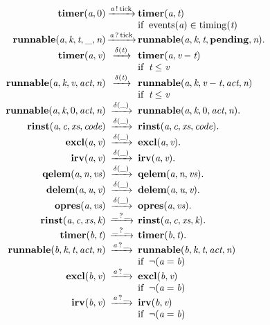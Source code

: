 \[\begin{array}{r@{}c@{}llllll}
\\\Prule{\Tstep{\Ttimer{\Tvar{A}}{0}}{\Tsay{\Tvar{A}}{\Ttick}}{\Ttimer{\Tvar{A}}{\Tvar{T}}}}{\Tmember{\Tevents{\Tvar{A}}}{\Ttiming{\Tvar{T}}}}
\\\Pfact{\Tstep{\Trunnable{\Tvar{A}}{\Tvar{K}}{\Tvar{T}}{\_}{\Tvar{N}}}{\Thear{\Tvar{A}}{\Ttick}}{\Trunnable{\Tvar{A}}{\Tvar{K}}{\Tvar{T}}{\Tpending}{\Tvar{N}}}}
\\\Prule{\Tstep{\Ttimer{\Tvar{A}}{\Tvar{V}}}{\Tdelta{\Tvar{T}}}{\Ttimer{\Tvar{A}}{\Tminus{\Tvar{V}}{\Tvar{T}}}}}{\Tlesseq{\Tvar{T}}{\Tvar{V}}}
\\\Prule{\Tstep{\Trunnable{\Tvar{A}}{\Tvar{K}}{\Tvar{V}}{\Tvar{Act}}{\Tvar{N}}}{\Tdelta{\Tvar{T}}}{\Trunnable{\Tvar{A}}{\Tvar{K}}{\Tminus{\Tvar{V}}{\Tvar{T}}}{\Tvar{Act}}{\Tvar{N}}}}{\Tlesseq{\Tvar{T}}{\Tvar{V}}}
\\\Pfact{\Tstep{\Trunnable{\Tvar{A}}{\Tvar{K}}{0}{\Tvar{Act}}{\Tvar{N}}}{\Tdelta{\_}}{\Trunnable{\Tvar{A}}{\Tvar{K}}{0}{\Tvar{Act}}{\Tvar{N}}}}
\\\Pfact{\Tstep{\Trinst{\Tvar{A}}{\Tvar{C}}{\Tvar{Xs}}{\Tvar{Code}}}{\Tdelta{\_}}{\Trinst{\Tvar{A}}{\Tvar{C}}{\Tvar{Xs}}{\Tvar{Code}}}}
\\\Pfact{\Tstep{\Texcl{\Tvar{A}}{\Tvar{V}}}{\Tdelta{\_}}{\Texcl{\Tvar{A}}{\Tvar{V}}}}
\\\Pfact{\Tstep{\Tirv{\Tvar{A}}{\Tvar{V}}}{\Tdelta{\_}}{\Tirv{\Tvar{A}}{\Tvar{V}}}}
\\\Pfact{\Tstep{\Tqelem{\Tvar{A}}{\Tvar{N}}{\Tvar{Vs}}}{\Tdelta{\_}}{\Tqelem{\Tvar{A}}{\Tvar{N}}{\Tvar{Vs}}}}
\\\Pfact{\Tstep{\Tdelem{\Tvar{A}}{\Tvar{U}}{\Tvar{V}}}{\Tdelta{\_}}{\Tdelem{\Tvar{A}}{\Tvar{U}}{\Tvar{V}}}}
\\\Pfact{\Tstep{\Topres{\Tvar{A}}{\Tvar{Vs}}}{\Tdelta{\_}}{\Topres{\Tvar{A}}{\Tvar{Vs}}}}
\\\Pfact{\Tstep{\Trinst{\Tvar{A}}{\Tvar{C}}{\Tvar{Xs}}{\Tvar{K}}}{\Thear{\_}{\_}}{\Trinst{\Tvar{A}}{\Tvar{C}}{\Tvar{Xs}}{\Tvar{K}}}}
\\\Pfact{\Tstep{\Ttimer{\Tvar{B}}{\Tvar{T}}}{\Thear{\_}{\_}}{\Ttimer{\Tvar{B}}{\Tvar{T}}}}
\\\Prule{\Tstep{\Trunnable{\Tvar{B}}{\Tvar{K}}{\Tvar{T}}{\Tvar{Act}}{\Tvar{N}}}{\Thear{\Tvar{A}}{\_}}{\Trunnable{\Tvar{B}}{\Tvar{K}}{\Tvar{T}}{\Tvar{Act}}{\Tvar{N}}}}{\Pnegate{\Tequal{\Tvar{A}}{\Tvar{B}}}}
\\\Prule{\Tstep{\Texcl{\Tvar{B}}{\Tvar{V}}}{\Thear{\Tvar{A}}{\_}}{\Texcl{\Tvar{B}}{\Tvar{V}}}}{\Pnegate{\Tequal{\Tvar{A}}{\Tvar{B}}}}
\\\Prule{\Tstep{\Tirv{\Tvar{B}}{\Tvar{V}}}{\Thear{\Tvar{A}}{\_}}{\Tirv{\Tvar{B}}{\Tvar{V}}}}{\Pnegate{\Tequal{\Tvar{A}}{\Tvar{B}}}}

\end{array}\]
